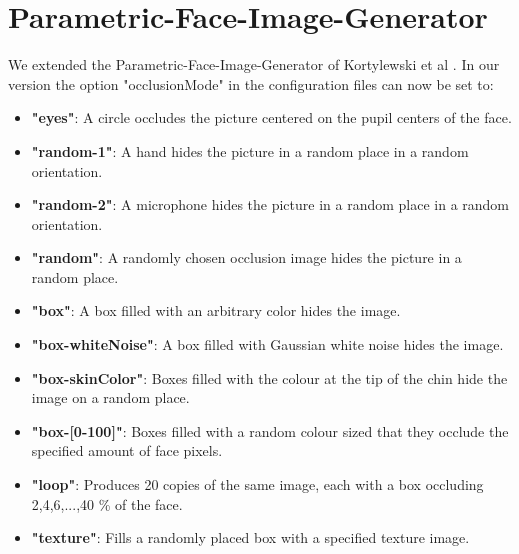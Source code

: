 \section{Parametric-Face-Image-Generator}
We extended the Parametric-Face-Image-Generator of Kortylewski et al \cite{parametric}. In our version the option "occlusionMode" in the configuration files can now be set to:
\begin{itemize}[nolistsep]
	\item \textbf{"eyes"}: A circle occludes the picture centered on the pupil centers of the face.
	\item \textbf{"random-1"}: A  hand hides the picture in a random place in a random orientation.
	\item \textbf{"random-2"}: A  microphone hides the picture in a random place in a random orientation.
	\item \textbf{"random"}: A randomly chosen occlusion image hides the picture in a random place.
	\item \textbf{"box"}: A box filled with an arbitrary color hides the image.
	\item \textbf{"box-whiteNoise"}: A box filled with Gaussian white noise hides the image.
	\item \textbf{"box-skinColor"}: Boxes filled with the colour at the tip of the chin hide the image on a random place.
	\item \textbf{"box-[0-100]"}: Boxes filled with a random colour sized that they occlude the specified amount of face pixels.
	\item \textbf{"loop"}: Produces 20 copies of the same image, each with a box occluding 2,4,6,...,40 \% of the face.
	\item \textbf{"texture"}: Fills a randomly placed box with a specified texture image.%
\end{itemize}



